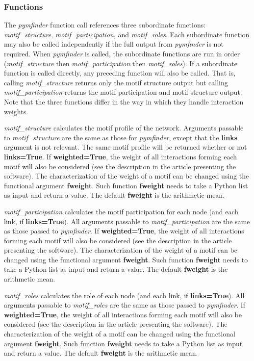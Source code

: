 \documentclass[12pt]{article}
\begin{document}
		\subsubsection{Functions}
			The \emph{pymfinder} function call references three subordinate functions: \emph{motif\_structure}, \emph{motif\_participation}, and \emph{motif\_roles}. Each subordinate function may also be called independently if the full output from \emph{pymfinder} is not required. When \emph{pymfinder} is called, the subordinate functions are run in order (\emph{motif\_structure} then \emph{motif\_participation} then \emph{motif\_roles}). If a subordinate function is called directly, any preceding function will also be called. That is, calling \emph{motif\_structure} returns only the motif structure output but calling \emph{motif\_participation} returns the motif participation and motif structure output. Note that the three functions differ in the way in which they handle interaction weights.

			\emph{motif\_structure} calculates the motif profile of the network. Arguments passable to \emph{motif\_structure} are the same as those for \emph{pymfinder}, except that the \textbf{links} argument is not relevant. The same motif profile will be returned whether or not \textbf{links=True}. If \textbf{weighted=True}, the weight of all interactions forming each motif will also be considered (see the description in the article presenting the software). The characterization of the weight of a motif can be changed using the functional argument \textbf{fweight}. Such function \textbf{fweight} needs to take a Python list as input and return a value. The default \textbf{fweight} is the arithmetic mean.

			\emph{motif\_participation} calculates the motif participation for each node (and each link, if \textbf{links=True}). All arguments passable to \emph{motif\_participation} are the same as those passed to \emph{pymfinder}. If \textbf{weighted=True}, the weight of all interactions forming each motif will also be considered (see the description in the article presenting the software). The characterization of the weight of a motif can be changed using the functional argument \textbf{fweight}. Such function \textbf{fweight} needs to take a Python list as input and return a value. The default \textbf{fweight} is the arithmetic mean.

			\emph{motif\_roles} calculates the role of each node (and each link, if \textbf{links=True}). All arguments passable to \emph{motif\_roles} are the same as those passed to \emph{pymfinder}. If \textbf{weighted=True}, the weight of all interactions forming each motif will also be considered (see the description in the article presenting the software). The characterization of the weight of a motif can be changed using the functional argument \textbf{fweight}. Such function \textbf{fweight} needs to take a Python list as input and return a value. The default \textbf{fweight} is the arithmetic mean.
\end{document}
